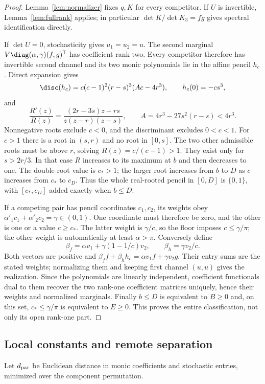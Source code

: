 \begin{proof}
Lemma~\ref{lem:normalizer} fixes $q,K$ for every competitor. If $U$ is
invertible, Lemma~\ref{lem:fullrank} applies; in particular
$\det K/\det K_3=fg$ gives spectral identification directly.

If $\det U=0$, stochasticity gives $u_1=u_2=u$. The second marginal
$V\diag(\alpha,\gamma)(f,g)^{\mathsf T}$ has coefficient rank two.
Every competitor therefore has invertible second channel and its two
monic polynomials lie in the affine pencil $h_c$. Direct expansion gives
\begin{equation}\label{eq:disc}
 \disc(h_c)=c(c-1)^2(r-s)^3(Ac-4r^3),\qquad h_c(0)=-cs^3,
\end{equation}
and
\[
 \frac{R'(z)}{R(z)}=\frac{(2r-3s)z+rs}{z(z-r)(z-s)},\qquad
 A=4r^3-27s^2(r-s)<4r^3.
\]
Nonnegative roots exclude $c<0$, and the discriminant excludes $0<c<1$.
For $c>1$ there is a root in $(s,r)$ and no root in $[0,s]$. The two
other admissible roots must be above $r$, solving $R(z)=c/(c-1)>1$.
They exist only for $s>2r/3$. In that case $R$ increases to its maximum
at $b$ and then decreases to one. The double-root value is $c_*>1$;
the larger root increases from $b$ to $D$ as $c$ increases from $c_*$
to $c_D$. Thus the whole real-rooted pencil in $[0,D]$ is $\{0,1\}$,
with $[c_*,c_D]$ added exactly when $b\le D$.

If a competing pair has pencil coordinates $c_1,c_2$, its weights obey
$\alpha'_1c_1+\alpha'_2c_2=\gamma\in(0,1)$. One coordinate must therefore
be zero, and the other is one or a value $c\ge c_*$. The latter weight
is $\gamma/c$, so the floor imposes $c\le\gamma/\pi$; the other weight
is automatically at least $\alpha>\pi$. Conversely define
\[
 \beta_f=\alpha v_1+\gamma(1-1/c)v_2,\qquad
 \beta_h=\gamma v_2/c.
\]
Both vectors are positive and
$\beta_ff+\beta_hh_c=\alpha v_1f+\gamma v_2g$.
Their entry sums are the stated weights; normalizing them and keeping
first channel $(u,u)$ gives the realization. Since the polynomials are
linearly independent, coefficient functionals dual to them recover the
two rank-one coefficient matrices uniquely, hence their weights and
normalized marginals. Finally $b\le D$ is equivalent to $B\ge0$ and,
on this set, $c_*\le\gamma/\pi$ is equivalent to $E\ge0$.
This proves the entire classification, not only its open rank-one part.
\end{proof}

\subsection{Local constants and remote separation}
Let $d_{\rm par}$ be Euclidean distance in monic coefficients and
stochastic entries, minimized over the component permutation.

